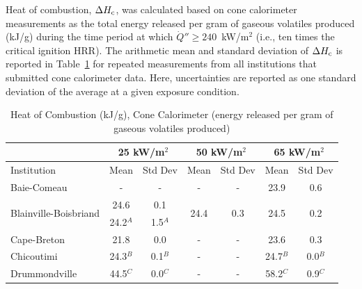 \documentclass{book}
\begin{document}
Heat of combustion, $\Delta H_{\rm c}$, was calculated based on cone calorimeter measurements as the total energy released per gram of gaseous volatiles produced (kJ/g) during the time period at which $\dot{Q}'' \ge 240$~kW/m$^2$ (i.e., ten times the critical ignition HRR). The arithmetic mean and standard deviation of $\Delta H_{\rm c}$ is reported in Table~\ref{Table_13} for repeated measurements from all institutions that submitted cone calorimeter data. Here, uncertainties are reported as one standard deviation of the average at a given exposure condition.

\begin{table}[h!]
\caption{Heat of Combustion (kJ/g), Cone Calorimeter (energy released per gram of gaseous volatiles produced)}
\label{Table_13}
\begin{center}
\begin{tabular}{|l|cc|cc|cc|}
\hline
                                        & \multicolumn{2}{|c|}{25 kW/m$^2$} &  \multicolumn{2}{|c|}{50 kW/m$^2$}             & \multicolumn{2}{|c|}{65 kW/m$^2$}                 \\ \hline
Institution                             & Mean     & Std Dev                & Mean                  & Std Dev                & Mean                  & Std Dev                   \\ \hline
Baie-Comeau                             & -        & -                      & -                     & -                      & 23.9                  & 0.6                       \\
\multirow{2}{*}{Blainville-Boisbriand}  & 24.6     & 0.1                    & \multirow{2}{*}{24.4} & \multirow{2}{*}{0.3}   & \multirow{2}{*}{24.5} & \multirow{2}{*}{0.2}      \\
                                        & 24.2$^A$ & 1.5$^A$                &                       &                        &                       &                           \\
Cape-Breton                             & 21.8     & 0.0                    & -                     & -                      & 23.6                  & 0.3                       \\
Chicoutimi                              & 24.3$^B$ & 0.1$^B$                & -                     & -                      & 24.7$^B$              & 0.0$^B$                   \\
Drummondville                           & 44.5$^C$ & 0.0$^C$                & -                     & -                      & 58.2$^C$              & 0.9$^C$                   \\

\end{tabular}
\end{center}
\end{table}
\end{document}
